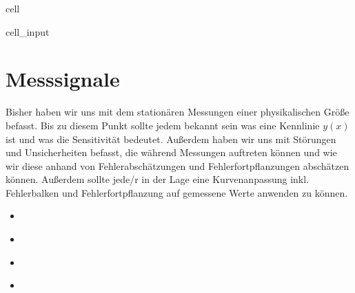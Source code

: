 \documentclass[letterpaper,10pt,english]{jupyterBook}
\begin{document}
\sphinxAtStartPar
{}

\sphinxstepscope

\begin{sphinxuseclass}{cell}\begin{sphinxVerbatimInput}

\begin{sphinxuseclass}{cell_input}
\begin{sphinxVerbatim}[commandchars=\\\{\}]
   
   
   
    
\end{sphinxVerbatim}

\end{sphinxuseclass}\end{sphinxVerbatimInput}

\end{sphinxuseclass}

\chapter{Messsignale}
\label{\detokenize{content/3_Messsignale:messsignale}}\label{\detokenize{content/3_Messsignale::doc}}
\sphinxAtStartPar
Bisher haben wir uns mit dem stationären Messungen einer physikalischen Größe befasst. Bis zu diesem Punkt sollte jedem bekannt sein was eine Kennlinie \(y(x)\) ist und was die Sensitivität bedeutet. Außerdem haben wir uns mit Störungen und Unsicherheiten befasst, die während Messungen auftreten können und wie wir diese anhand von Fehlerabschätzungen und Fehlerfortpflanzungen abschätzen können. Außerdem sollte jede/r in der Lage eine Kurvenanpassung inkl. Fehlerbalken und Fehlerfortpflanzung auf gemessene Werte anwenden zu können.
\begin{itemize}
\item {} 
\sphinxAtStartPar
{\hyperref[\detokenize{content/3_basics::doc}]{}}

\item {} 
\sphinxAtStartPar
{\hyperref[\detokenize{content/3_Kenngroessen::doc}]{}}

\item {} 
\sphinxAtStartPar
{\hyperref[\detokenize{content/2_Digital::doc}]{}}

\item {} 
\sphinxAtStartPar
{\hyperref[\detokenize{content/3_FourierAnalyse::doc}]{}}

\end{itemize}
\end{document}
